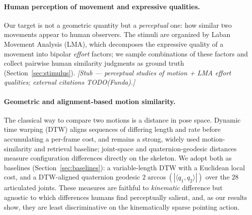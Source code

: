 \documentclass[letterpaper]{article} %
\begin{document}
\paragraph{Human perception of movement and expressive qualities.}
Our target is not a geometric quantity but a \emph{perceptual} one: how similar two movements appear
to human observers. The stimuli are organized by Laban Movement Analysis (LMA), which decomposes the
expressive quality of a movement into bipolar \emph{effort} factors; we sample combinations of these
factors and collect pairwise human similarity judgments as ground truth (Section~\ref{sec:stimulus}).
\emph{[Stub --- perceptual studies of motion + LMA effort qualities; external citations TODO(Funda).]}

\paragraph{Geometric and alignment-based motion similarity.}
The classical way to compare two motions is a distance in pose space. Dynamic time warping (DTW)
aligns sequences of differing length and rate before accumulating a per-frame cost, and remains a
strong, widely used motion-similarity and retrieval baseline; joint-space and quaternion-geodesic
distances measure configuration differences directly on the skeleton. We adopt both as baselines
(Section~\ref{sec:baselines}): a variable-length DTW with a Euclidean local cost, and a DTW-aligned quaternion
geodesic $2\arccos(|\langle q_1,q_2\rangle|)$ over the $28$ articulated joints. These measures are
faithful to \emph{kinematic} difference but agnostic to which differences humans find perceptually
salient, and, as our results show, they are least discriminative on the kinematically sparse
pointing action.
\end{document}
